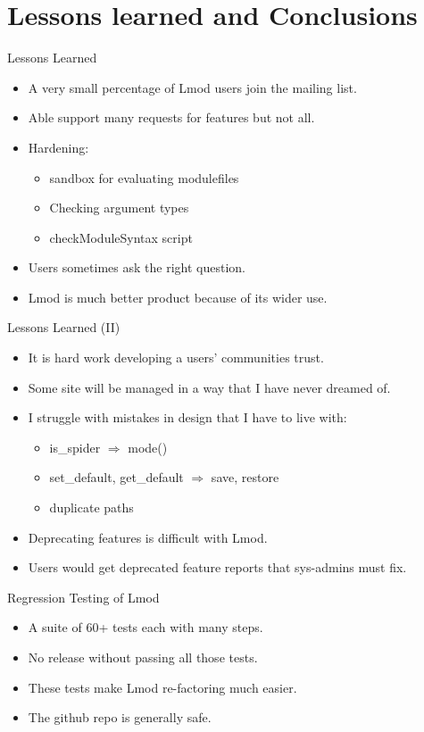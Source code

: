 \documentclass{beamer}
\begin{document}
\section{Lessons learned and Conclusions}

\begin{frame}{Lessons Learned}
  \begin{itemize}
    \item A very small percentage of Lmod users join the mailing list.
    \item Able support many requests for features but not all.
    \item Hardening:
      \begin{itemize}
        \item sandbox for evaluating modulefiles
        \item Checking argument types
        \item checkModuleSyntax script
      \end{itemize}
    \item Users sometimes ask the right question.
    \item Lmod is much better product because of its wider use.
  \end{itemize}
\end{frame}

\begin{frame}{Lessons Learned (II)}
  \begin{itemize}
    \item It is hard work developing a users' communities trust.
    \item Some site will be managed in a way that I have never dreamed of.
    \item I struggle with mistakes in design that I have to live with:
      \begin{itemize}
        \item is\_spider $\Rightarrow$ mode()
        \item set\_default, get\_default $\Rightarrow$ save, restore
        \item duplicate paths
      \end{itemize}
    \item Deprecating features is difficult with Lmod.
    \item Users would get deprecated feature reports that sys-admins
      must fix.
  \end{itemize}
\end{frame}


\begin{frame}{Regression Testing of Lmod}
  \begin{itemize}
    \item A suite of 60+ tests each with many steps.
    \item No release without passing all those tests.
    \item These tests make Lmod re-factoring much easier.
    \item The github repo is generally safe.
  \end{itemize}
\end{frame}
\end{document}
